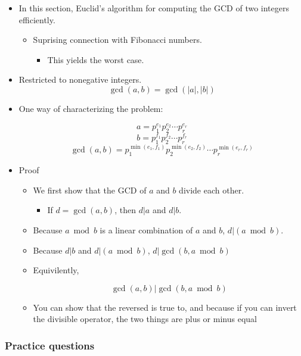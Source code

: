 \documentclass[a4paper,11pt]{article}
\begin{document}
\begin{itemize}
\item
  In this section, Euclid's algorithm for computing the GCD of two
  integers efficiently.

  \begin{itemize}
  \itemsep1pt\parskip0pt
  \item
    Suprising connection with Fibonacci numbers.

    \begin{itemize}
    \itemsep1pt\parskip0pt
    \item
      This yields the worst case.
    \end{itemize}
  \end{itemize}
\item
  Restricted to nonegative integers. \[\gcd(a, b) = \gcd(|a|, |b|)\]
\item
  One way of characterizing the problem:

  \[a = p_{1}^{e_1}p_{2}^{e_2} \cdots p_{r}^{e_r}\]
  \[b = p_{1}^{f_1}p_{2}^{f_2} \cdots p_{r}^{f_r}\]
  \[\gcd(a, b) = p_{1}^{\min(e_1, f_1)} p_{2}^{\min(e_2, f_2)} \cdots p_{r}^{\min(e_r, f_r)}\]
\item
  Proof

  \begin{itemize}
  \item
    We first show that the GCD of $a$ and $b$ divide each other.

    \begin{itemize}
    \itemsep1pt\parskip0pt
    \item
      If $d = \gcd(a, b)$, then $d | a$ and $d | b$.
    \end{itemize}
  \item
    Because $a \bmod b$ is a linear combination of $a$ and $b$,
    $d | (a \bmod b)$.
  \item
    Because $d | b$ and $d | (a \bmod b)$, $d | \gcd(b, a \bmod b)$
  \item
    Equivilently,

    \[\gcd(a, b) | \gcd(b, a \bmod b)\]
  \item
    You can show that the reversed is true to, and because if you can
    invert the divisible operator, the two things are plus or minus
    equal
  \end{itemize}
\end{itemize}

\subsubsection{Practice questions}\label{practice-questions-1}
\end{document}
